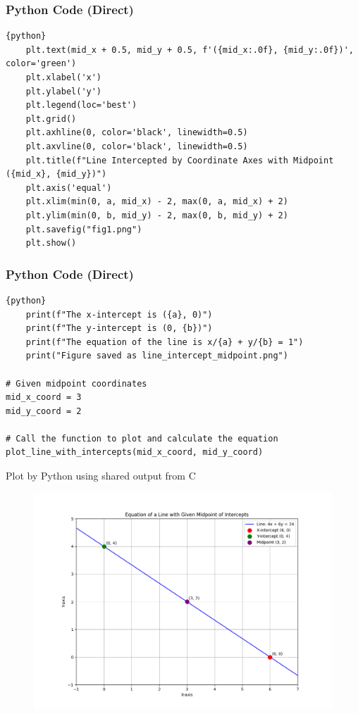 \documentclass{beamer}
\begin{document}
\begin{frame}[fragile]
\frametitle{Python Code (Direct)}
\begin{lstlisting}{python}
    plt.text(mid_x + 0.5, mid_y + 0.5, f'({mid_x:.0f}, {mid_y:.0f})', color='green')
    plt.xlabel('x')
    plt.ylabel('y')
    plt.legend(loc='best')
    plt.grid()
    plt.axhline(0, color='black', linewidth=0.5)
    plt.axvline(0, color='black', linewidth=0.5)
    plt.title(f"Line Intercepted by Coordinate Axes with Midpoint ({mid_x}, {mid_y})")
    plt.axis('equal')
    plt.xlim(min(0, a, mid_x) - 2, max(0, a, mid_x) + 2)
    plt.ylim(min(0, b, mid_y) - 2, max(0, b, mid_y) + 2)
    plt.savefig("fig1.png")
    plt.show() 
\end{lstlisting}
\end{frame}

\begin{frame}[fragile]
\frametitle{Python Code (Direct)}
\begin{lstlisting}{python}
    print(f"The x-intercept is ({a}, 0)")
    print(f"The y-intercept is (0, {b})")
    print(f"The equation of the line is x/{a} + y/{b} = 1")
    print("Figure saved as line_intercept_midpoint.png")

# Given midpoint coordinates
mid_x_coord = 3
mid_y_coord = 2

# Call the function to plot and calculate the equation
plot_line_with_intercepts(mid_x_coord, mid_y_coord)
\end{lstlisting}
\end{frame}

\begin{frame}{Plot by Python using shared output from C}
\begin{figure}[H]
\centering
\includegraphics[width=0.9\columnwidth]{../figs/fig1.png}
\caption{}
\label{fig:1}
\end{figure}
\end{frame}
\end{document}
